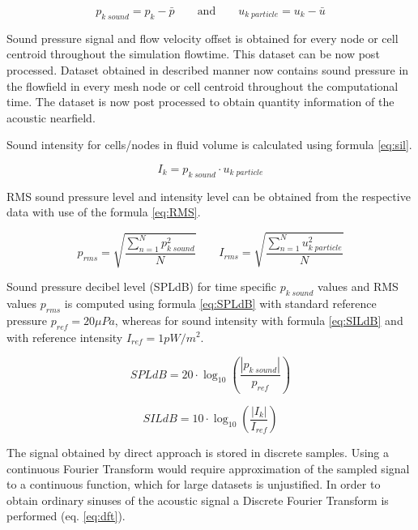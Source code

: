 \begin{equation} \label{eq:off}
p_{k \; sound} = p_k - \bar{p} \qquad \text{and} \qquad u_{k \; particle} = u_k - \bar{u}
\end{equation}

Sound pressure signal and flow velocity offset is obtained for every node or cell centroid throughout the simulation flowtime. This dataset can be now post processed. Dataset obtained in described manner now contains sound pressure in the flowfield in every mesh node or cell centroid throughout the computational time. The dataset is now post processed to obtain quantity information of the acoustic nearfield. 

Sound intensity for cells/nodes in fluid volume is calculated using formula \ref{eq:sil}. 

\begin{equation} \label{eq:sil}
I_{k} = p_{k \; sound} \cdot u_{k \; particle}
\end{equation}

RMS sound pressure level and intensity level can be obtained from the respective data with use of the formula \ref{eq:RMS}.

\begin{equation} \label{eq:RMS}
p_{rms} = \sqrt{\frac{\sum_{n=1}^{N} p_{k \; sound}^{2}}{N}} \qquad I_{rms} = \sqrt{\frac{\sum_{n=1}^{N} u_{k \; particle}^{2}}{N}}
\end{equation}

Sound pressure decibel level (SPLdB) for time specific $p_{k \; sound}$ values and RMS values $p_{rms}$ is computed using formula \ref{eq:SPLdB} with standard reference pressure $p_{ref} = 20 \mu Pa$, whereas for sound intensity with formula \ref{eq:SILdB} and with reference intensity $I_{ref} = 1 pW/m^{2}$.

\begin{equation} \label{eq:SPLdB}
SPLdB = 20 \cdot \log_{10}\left(\frac{|p_{k \; sound}|}{p_{ref}}\right)
\end{equation}

\begin{equation} \label{eq:SILdB}
SILdB = 10 \cdot \log_{10}\left(\frac{|I_{k}|}{I_{ref}}\right)
\end{equation}

The signal obtained by direct approach is stored in discrete samples. Using a continuous Fourier Transform would require approximation of the sampled signal to a continuous function, which for large datasets is unjustified. In order to obtain ordinary sinuses of the acoustic signal a Discrete Fourier Transform is performed (eq. \ref{eq:dft}).

